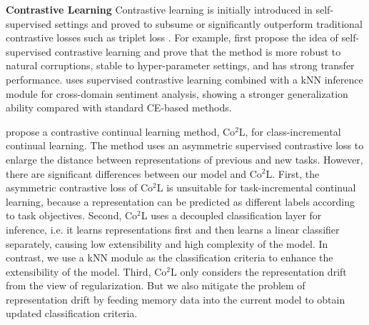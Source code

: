 


\textbf{Contrastive Learning}
Contrastive learning is initially introduced in self-supervised settings  and proved to  subsume or significantly outperform traditional contrastive losses such as triplet loss \cite{chen2020simple,wu2018unsupervised,gao-etal-2021-simcse,}.  For example, \citet{khosla2020supervised} first propose the idea of self-supervised contrastive learning and prove that the method is more robust to natural corruptions, stable to hyper-parameter settings,  and has strong transfer performance. \citet{luo2022mere} uses supervised contrastive learning combined with a kNN inference module for cross-domain sentiment analysis,  showing a stronger generalization ability compared with standard CE-based methods. 

\citet{cha2021co2l} propose a contrastive continual learning method, Co$^2$L, for class-incremental continual learning. The method uses an asymmetric supervised contrastive loss to enlarge the distance between representations of previous and new tasks.  However, there are significant differences between our model and Co$^2$L. First, the asymmetric contrastive loss of Co$^2$L is unsuitable for task-incremental continual learning,  because a representation can be predicted as different labels according to task objectives. Second, Co$^2$L  uses a decoupled classification layer for inference, i.e. it learns representations first and then learns a linear classifier separately, causing low extensibility and high complexity of the model. In contrast, we use a kNN module as the classification criteria to enhance the extensibility of the model. Third, Co$^2$L only considers the representation drift from the view of regularization. But we also mitigate the problem of representation drift by feeding memory data into the current model to obtain updated classification criteria.
